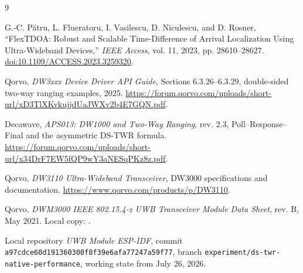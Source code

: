 \documentclass[11pt,a4paper]{article}
\begin{document}
\begin{thebibliography}{9}

G.-C. Pătru, L. Flueratoru, I. Vasilescu, D. Niculescu, and D. Rosner,
``FlexTDOA: Robust and Scalable Time-Difference of Arrival Localization Using
Ultra-Wideband Devices,'' \emph{IEEE Access}, vol. 11, 2023,
pp. 28610--28627.
\href{https://doi.org/10.1109/ACCESS.2023.3259320}
{doi:10.1109/ACCESS.2023.3259320}.

Qorvo, \emph{DW3xxx Device Driver API Guide}, Sections 6.3.26--6.3.29,
double-sided two-way ranging examples, 2025.
\url{https://forum.qorvo.com/uploads/short-url/xD3TlXKvkujjdUaJWXv2b4E7GQN.pdf}.

Decawave, \emph{APS013: DW1000 and Two-Way Ranging}, rev. 2.3,
Poll--Response--Final and the asymmetric DS-TWR formula.
\url{https://forum.qorvo.com/uploads/short-url/x34DrF7EW5fQP9wY3aNESqPKz8z.pdf}.

Qorvo, \emph{DW3110 Ultra-Wideband Transceiver}, DW3000 specifications and
documentation.
\url{https://www.qorvo.com/products/p/DW3110}.

Qorvo, \emph{DWM3000 IEEE 802.15.4-z UWB Transceiver Module Data Sheet},
rev. B, May 2021. Local copy:
.

Local repository \emph{UWB Module ESP-IDF}, commit
\texttt{a97cdce60d191360300f8f39e6afa77247a59f77}, branch
\texttt{experiment/ds-twr-native-performance}, working state from
July 26, 2026.

\end{thebibliography}
\end{document}

